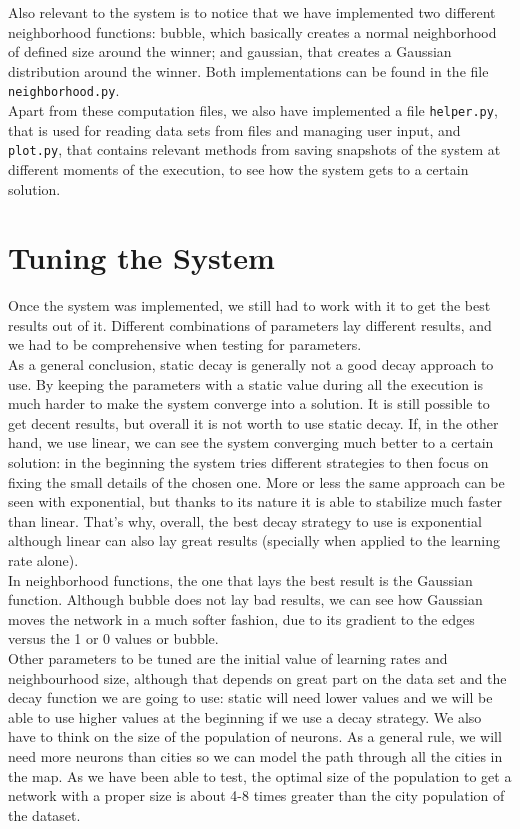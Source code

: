 \documentclass[11pt]{article}
\begin{document}
Also relevant to the system is to notice that we have implemented two different
neighborhood functions: bubble, which basically creates a normal neighborhood
of defined size around the winner; and gaussian, that creates a Gaussian
distribution around the winner. Both implementations can be found in the file
\texttt{neighborhood.py}.\\

Apart from these computation files, we also have implemented a file
\texttt{helper.py}, that is used for reading data sets from files and managing
user input, and \texttt{plot.py}, that contains relevant methods from saving
snapshots of the system at different moments of the execution, to see how the
system gets to a certain solution.

\section{Tuning the System}

Once the system was implemented, we still had to work with it to get the best
results out of it. Different combinations of parameters lay different results,
and we had to be comprehensive when testing for parameters.\\

As a general conclusion, static decay is generally not a good decay approach to
use. By keeping the parameters with a static value during all the execution is
much harder to make the system converge into a solution. It is still possible to
get decent results, but overall it is not worth to use static decay. If, in the
other hand, we use linear, we can see the system converging much better to a
certain solution: in the beginning the system tries different strategies to then
focus on fixing the small details of the chosen one. More or less the same
approach can be seen with exponential, but thanks to its nature it is able to
stabilize much faster than linear. That's why, overall, the best decay strategy
to use is exponential although linear can also lay great results (specially when
applied to the learning rate alone).\\

In neighborhood functions, the one that lays the best result is the Gaussian
function. Although bubble does not lay bad results, we can see how Gaussian
moves the network in a much softer fashion, due to its gradient to the edges
versus the 1 or 0 values or bubble.\\

Other parameters to be tuned are the initial value of learning rates and
neighbourhood size, although that depends on great part on the data set and the
decay function we are going to use: static will need lower values and we will be
able to use higher values at the beginning if we use a decay strategy. We also
have to think on the size of the population of neurons. As a general rule, we
will need more neurons than cities so we can model the path through all the
cities in the map. As we have been able to test, the optimal size of the
population to get a network with a proper size is about 4-8 times greater than
the city population of the dataset.\\
\end{document}
